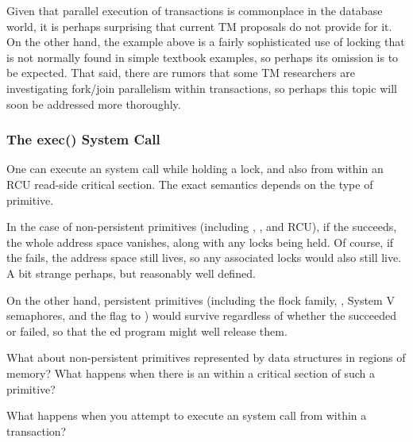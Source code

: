 Given that parallel execution of transactions is commonplace in the
database world, it is perhaps surprising that current TM proposals do
not provide for it.
On the other hand, the example above is a fairly sophisticated use
of locking that is not normally found in simple textbook examples,
so perhaps its omission is to be expected.
That said, there are rumors that some TM researchers are investigating
fork/join parallelism within transactions, so perhaps this topic will
soon be addressed more thoroughly.

\subsubsection{The exec() System Call}
\label{sec:future:The exec System Call}

One can execute an  system call while holding a lock, and
also from within an RCU read-side critical section.
The exact semantics depends on the type of primitive.

In the case of non-persistent primitives (including
, , and RCU),
if the  succeeds, the whole address space vanishes, along
with any locks being held.
Of course, if the  fails, the address space still lives,
so any associated locks would also still live.
A bit strange perhaps, but reasonably well defined.

On the other hand, persistent primitives (including the flock family,
, System V semaphores, and the  flag to
) would survive regardless of whether the 
succeeded or failed, so that the ed program might well
release them.

\QuickQuiz{}
	What about non-persistent primitives represented by data
	structures in  regions of memory?
	What happens when there is an  within a critical
	section of such a primitive?
 \QuickQuizEnd

What happens when you attempt to execute an  system call
from within a transaction?

